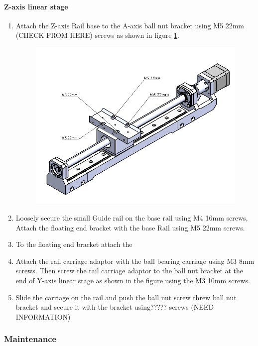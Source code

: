 \paragraph{Z-axis linear stage}
\begin{enumerate}

\item Attach the Z-axis Rail base to the A-axis ball nut bracket using M5 22mm (CHECK FROM HERE) screws as shown in figure \ref{fig:zaxis1}.

\begin{figure}
    \centering
    \includegraphics[scale=0.5]{Platforms/figs/zaxis1.png}
    \caption{\label{fig:zaxis1}}
\end{figure}

\item Loosely secure the small Guide rail on the base rail using M4 16mm screws, Attach the floating end bracket with the base Rail using M5 22mm screws.

\item To the floating end bracket attach the 

\item Attach the rail carriage adaptor with the ball bearing carriage using M3 8mm screws. Then screw the rail carriage adaptor to the ball nut bracket at the end of Y-axis linear stage as shown in the figure  using the M3 10mm screws.

\item Slide the carriage on the rail and push the ball nut screw threw ball nut bracket and secure it with the bracket using????? screws (NEED INFORMATION)


\end{enumerate}

\subsubsection{Maintenance}